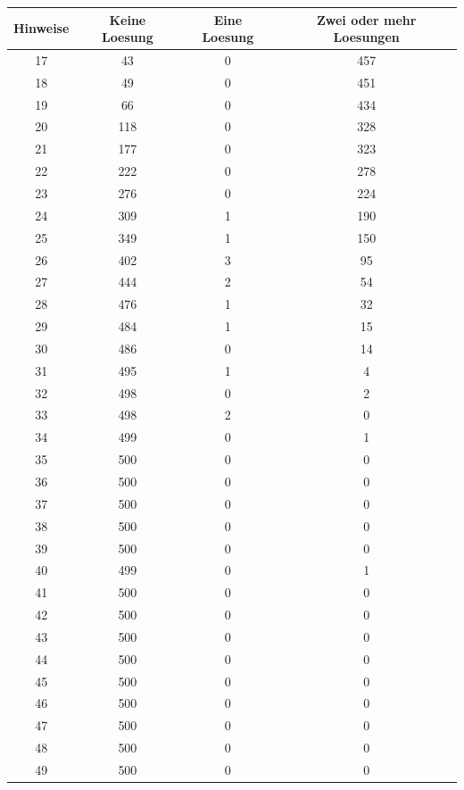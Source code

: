 \documentclass[11pt,a4paper]{article}
\begin{document}
\begin{table}[htbp!]
\scriptsize
\begin{center}
\begin{tabular}{|*{4}{c|}}
\hline 
Hinweise & Keine Loesung & Eine Loesung & Zwei oder mehr Loesungen\\ \hline 
17 & 43 & 0 & 457 \\ \hline 
 18 & 49 & 0 & 451 \\ \hline 
 19 & 66 & 0 & 434 \\ \hline 
 20 & 118 & 0 & 328 \\ \hline 
 21 & 177 & 0 & 323 \\ \hline 
 22 & 222 & 0 & 278 \\ \hline 
 23 & 276 & 0 & 224 \\ \hline 
 24 & 309 & 1 & 190 \\ \hline 
 25 & 349 & 1 & 150 \\ \hline 
 26 & 402 & 3 & 95 \\ \hline 
 27 & 444 & 2 & 54 \\ \hline 
 28 & 476 & 1 & 32 \\ \hline 
 29 & 484 & 1 & 15 \\ \hline 
 30 & 486 & 0 & 14 \\ \hline 
 31 & 495 & 1 & 4 \\ \hline 
 32 & 498 & 0 & 2 \\ \hline 
 33 & 498 & 2 & 0 \\ \hline 
 34 & 499 & 0 & 1 \\ \hline 
 35 & 500 & 0 & 0 \\ \hline 
 36 & 500 & 0 & 0 \\ \hline 
 37 & 500 & 0 & 0 \\ \hline 
 38 & 500 & 0 & 0 \\ \hline 
 39 & 500 & 0 & 0 \\ \hline 
 40 & 499 & 0 & 1 \\ \hline 
 41 & 500 & 0 & 0 \\ \hline 
 42 & 500 & 0 & 0 \\ \hline 
 43 & 500 & 0 & 0 \\ \hline 
 44 & 500 & 0 & 0 \\ \hline 
 45 & 500 & 0 & 0 \\ \hline 
 46 & 500 & 0 & 0 \\ \hline 
 47 & 500 & 0 & 0 \\ \hline 
 48 & 500 & 0 & 0 \\ \hline 
 49 & 500 & 0 & 0 \\ \hline 

\end{tabular}
\end{center}
\end{table}
\end{document}
